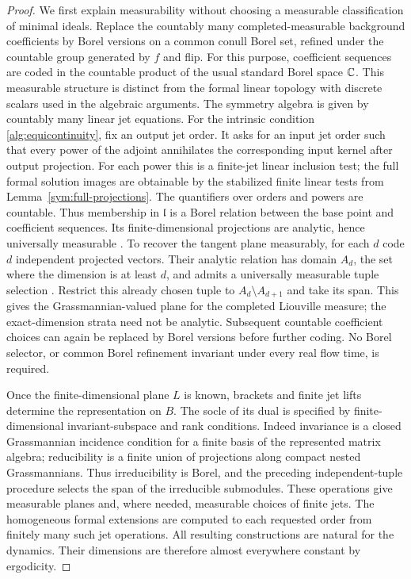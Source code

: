 \begin{proof}
We first explain measurability without choosing a measurable
classification of minimal ideals. Replace the countably many
completed-measurable background coefficients by Borel versions on a
common conull Borel set, refined under the countable group generated
by $f$ and flip. For this purpose, coefficient
sequences are coded in the countable product of the usual standard
Borel space $\mathbb C$. This measurable structure is distinct from the
formal linear topology with discrete scalars used in the algebraic
arguments. The symmetry algebra is given by
countably many linear jet equations. For the intrinsic condition
\eqref{alg:equicontinuity}, fix an output jet order. It asks for an
input jet order such that every power of the adjoint annihilates the
corresponding input kernel after output projection. For each power
this is a finite-jet linear inclusion test; the full formal solution
images are obtainable by the stabilized finite linear tests from
Lemma~\ref{sym:full-projections}. The quantifiers over orders and powers
are countable. Thus membership in $\mathfrak l$ is a Borel
relation between the base point and coefficient sequences. Its
finite-dimensional projections are analytic, hence universally
measurable \citep[Proposition~12.2 and Corollary~14.10]{Tserunyan2025}.
To recover the tangent plane measurably, for each $d$ code $d$
independent projected vectors. Their analytic relation has domain
$A_d$, the set where the dimension is at least $d$, and admits a
universally measurable tuple selection
\citep[Section~4E.9]{Moschovakis2009}. Restrict this already chosen
tuple to $A_d\setminus A_{d+1}$ and take its span. This gives the
Grassmannian-valued plane for the completed Liouville measure;
the exact-dimension strata need not be analytic. Subsequent countable
coefficient choices can again be replaced by Borel versions before
further coding. No Borel selector, or common Borel refinement invariant
under every real flow time, is required.

Once the finite-dimensional plane $L$ is known, brackets and finite
jet lifts determine the representation on $B$. The socle of its
dual is specified by finite-dimensional invariant-subspace and rank
conditions. Indeed invariance is a closed Grassmannian incidence
condition for a finite basis of the represented matrix algebra;
reducibility is a finite union of projections along compact nested
Grassmannians. Thus irreducibility is Borel, and the preceding
independent-tuple procedure selects the span of the irreducible
submodules. These operations give measurable planes and, where
needed, measurable choices of finite jets. The homogeneous formal
extensions are computed to each requested order from finitely many
such jet operations. All resulting constructions are natural for
the dynamics. Their dimensions are therefore almost everywhere
constant by ergodicity.


\end{proof}
